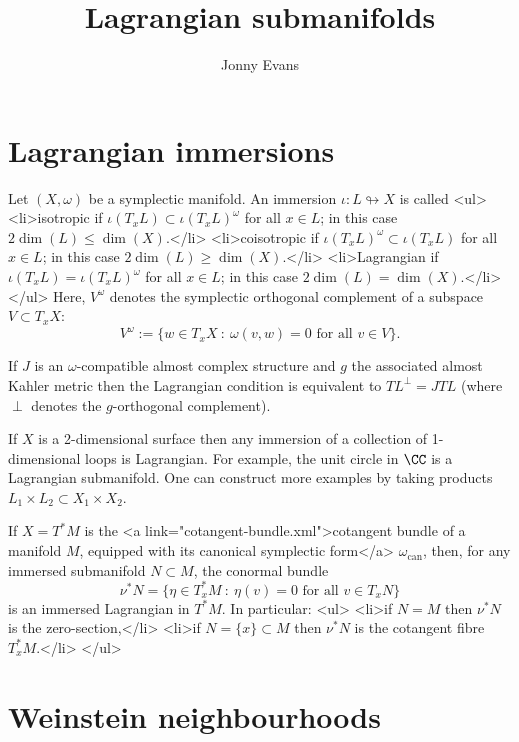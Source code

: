 \documentclass{article}
\title{Lagrangian submanifolds}
\author{Jonny Evans}
\begin{document}
\section{Lagrangian immersions}

\begin{Definition}
  Let $(X,\omega)$ be a symplectic manifold. An immersion $\iota\colon L\looparrowright X$ is called
  <ul>
  <li>isotropic if $\iota(T_xL)\subset\iota(T_xL)^{\omega}$ for all $x\in L$; in this case $2\dim(L)\leq\dim(X)$.</li>
  <li>coisotropic if $\iota(T_xL)^{\omega}\subset\iota(T_xL)$ for all $x\in L$; in this case $2\dim(L)\geq\dim(X)$.</li>
  <li>Lagrangian if $\iota(T_xL)=\iota(T_xL)^{\omega}$ for all $x\in L$; in this case $2\dim(L)=\dim(X)$.</li>
  </ul>
  Here, $V^{\omega}$ denotes the symplectic orthogonal complement of a subspace $V\subset T_xX$:
  \[V^{\omega}:=\{w\in T_xX\ :\ \omega(v,w)=0\mbox{ for all }v\in V\}.\]
\end{Definition}

\begin{Remark}
  If $J$ is an $\omega$-compatible almost complex structure and $g$ the associated almost Kahler metric then the Lagrangian condition is equivalent to $TL^{\perp}=JTL$ (where $\perp$ denotes the $g$-orthogonal complement).
\end{Remark}

\begin{Example}
  If $X$ is a 2-dimensional surface then any immersion of a collection of 1-dimensional loops is Lagrangian. For example, the unit circle in $\CC$ is a Lagrangian submanifold. One can construct more examples by taking products $L_1\times L_2\subset X_1\times X_2$.
\end{Example}

\begin{Example}
  If $X=T^*M$ is the <a link="cotangent-bundle.xml">cotangent bundle of a manifold $M$, equipped with its canonical symplectic form</a> $\omega_{\mathrm{can}}$, then, for any immersed submanifold $N\subset M$, the conormal bundle
  \[\nu^*N=\{\eta\in T_x^*M\ :\ \eta(v)=0\mbox{ for all }v\in T_xN\}\]
  is an immersed Lagrangian in $T^*M$. In particular:
  <ul>
  <li>if $N=M$ then $\nu^*N$ is the zero-section,</li>
  <li>if $N=\{x\}\subset M$ then $\nu^*N$ is the cotangent fibre $T_x^*M$.</li>
  </ul>
\end{Example}

\section{Weinstein neighbourhoods}
\end{document}
